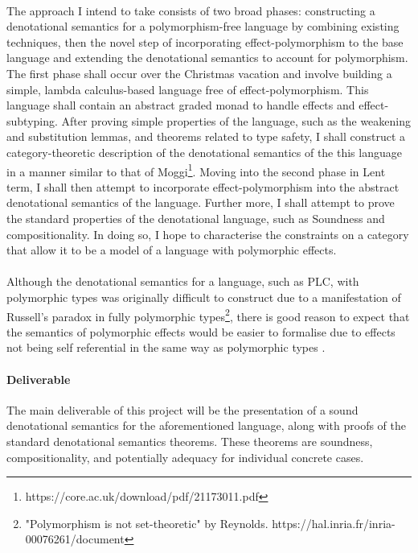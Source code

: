 \documentclass[11pt]{article}
\begin{document}
\paragraph{}{
The approach I intend to take consists of two broad phases: constructing a denotational semantics for a polymorphism-free language by combining existing techniques, then the novel step of incorporating effect-polymorphism to the base language and extending the denotational semantics to account for polymorphism. The first phase shall occur over the Christmas vacation and involve building a simple, lambda calculus-based language free of effect-polymorphism. This language shall contain an abstract graded monad to handle effects and effect-subtyping. After proving simple properties of the language, such as the weakening and substitution lemmas, and theorems related to type safety, I shall construct a category-theoretic description of the denotational semantics of the this language in a manner similar to that of Moggi\footnote{https://core.ac.uk/download/pdf/21173011.pdf}. Moving into the second phase in Lent term, I shall then attempt to incorporate effect-polymorphism into the abstract denotational semantics of the language. Further more, I shall attempt to prove the standard properties of the denotational language, such as Soundness and compositionality. In doing so, I hope to characterise the constraints on a category that allow it to be a model of a language with polymorphic effects.
}

\paragraph{}{
Although the denotational semantics for a language, such as PLC, with polymorphic types was originally difficult to construct due to a manifestation of Russell's paradox in fully polymorphic types\footnote{"Polymorphism
is not set-theoretic" by Reynolds. https://hal.inria.fr/inria-00076261/document}, there is good reason to expect that the semantics of polymorphic effects would be easier to formalise due to effects not being self referential in the same way as polymorphic types .
}




\paragraph{Deliverable}{
The main deliverable of this project will be the presentation of a sound denotational semantics for the aforementioned language, along with proofs of the standard denotational semantics theorems. These theorems are soundness, compositionality, and potentially adequacy for individual concrete cases.
}
\end{document}

